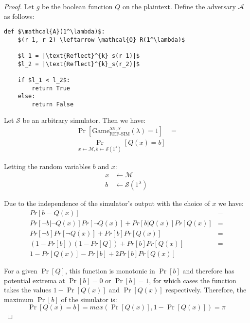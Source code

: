 \begin{lemma}
\end{lemma}

\begin{proof}

Let $g$ be the boolean function $Q$ on the plaintext. Define the adversary
$\mathcal{A}$ as follows:

\begin{lstlisting}[texcl,mathescape,basicstyle=\small]
def $\mathcal{A}(1^\lambda)$:
    $(r_1, r_2) \leftarrow \mathcal{O}_R(1^\lambda)$

    $l_1 = |\text{Reflect}^{k}_s(r_1)|$
    $l_2 = |\text{Reflect}^{k}_s(r_2)|$

    if $l_1 < l_2$:
        return True
    else:
        return False
\end{lstlisting}

Let $\mathcal{S}$ be an arbitrary simulator. Then we have:
\begin{align*}
    \Pr[\text{Game}_{\text{REF-SIM}}^{\mathcal{SE},\mathcal{S}}
        (\lambda) = 1] &=\\
    \Pr_{x \leftarrow \mathcal{M}, b \leftarrow \mathcal{S}(1^\lambda)}
        [Q(x) = b]
\end{align*}

Letting the random variables $b$ and $x$:
\begin{align*}
    x &\leftarrow \mathcal{M}\\
    b &\leftarrow \mathcal{S}(1^\lambda)
\end{align*}

Due to the independence of the simulator's output with the choice of $x$ we have:
\begin{align*}
    Pr[b = Q(x)] &=\\
    Pr[\lnot b|\lnot Q(x)]Pr[\lnot Q(x)] + Pr[b|Q(x)]Pr[Q(x)] &=\\
    Pr[\lnot b]Pr[\lnot Q(x)] + Pr[b]Pr[Q(x)] &=\\
    (1 - Pr[b])(1 - Pr[Q]) + Pr[b]Pr[Q(x)] &=\\
    1 - Pr[Q(x)] - Pr[b] + 2Pr[b]Pr[Q(x)]
\end{align*}

For a given $\Pr[Q]$, this function is monotonic in $\Pr[b]$ and therefore has
potential extrema at $\Pr[b] = 0$ or $\Pr[b] = 1$, for which cases the function
takes the values $1 - \Pr[Q(x)]$ and $\Pr[Q(x)]$ respectively. Therefore, the
maximum $\Pr[b]$ of the simulator is:
\begin{equation*}
    \Pr[Q(x) = b] = max(\Pr[Q(x)], 1 - \Pr[Q(x)]) = \pi
\end{equation*}


\end{proof}
